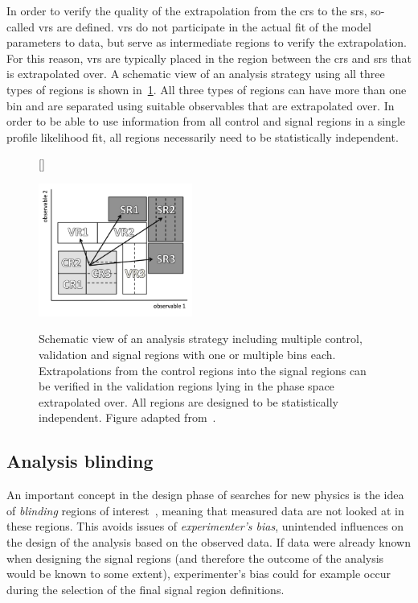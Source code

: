 In order to verify the quality of the extrapolation from the \glspl{cr} to the \glspl{sr}, so-called \glspl{vr} are defined. \glspl{vr} do not participate in the actual fit of the model parameters to data, but serve as intermediate regions to verify the extrapolation. For this reason, \glspl{vr} are typically placed in the region between the \glspl{cr} and \glspl{sr} that is extrapolated over. A schematic view of an analysis strategy using all three types of regions is shown in~\cref{fig:hf_strategy}. All three types of regions can have more than one bin and are separated using suitable observables that are extrapolated over. In order to be able to use information from all control and signal regions in a single profile likelihood fit, all regions necessarily need to be statistically independent.

\begin{figure}
[\FBwidth]
{\caption{Schematic view of an analysis strategy including multiple control, validation and signal regions with one or multiple bins each. Extrapolations from the control regions into the signal regions can be verified in the validation regions lying in the phase space extrapolated over. All regions are designed to be statistically independent. Figure adapted from~\cite{HistFitter:2014wma}.}\label{fig:hf_strategy}}
{\includegraphics[width=0.45\textwidth]{hf_strategy}}
\end{figure}

\subsection{Analysis blinding}

An important concept in the design phase of searches for new physics is the idea of \textit{blinding} regions of interest~\cite{blind:2003rw}, meaning that measured data are not looked at in these regions. This avoids issues of \textit{experimenter's bias}, \ie unintended influences on the design of the analysis based on the observed data. If data were already known when designing the signal regions (and therefore the outcome of the analysis would be known to some extent), experimenter's bias could for example occur during the selection of the final signal region definitions.

